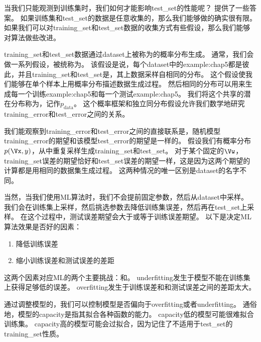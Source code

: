 
当我们只能观测到训练集时，我们如何才能影响\gls{test_set}的性能呢？
提供了一些答案。
如果训练集和\gls{test_set}的数据是任意收集的，那么我们能够做的确实很有限。
如果我们可以对\gls{training_set}和\gls{test_set}数据的收集方式有些假设，那么我们能够对算法做些改进。

\gls{training_set}和\gls{test_set}数据通过\gls{dataset}上被称为的概率分布生成。
通常，我们会做一系列假设，被统称为。
该假设是说，每个\gls{dataset}中的\gls{example:chap5}都是彼此，并且\gls{training_set}和\gls{test_set}是，其上数据采样自相同的分布。
这个假设使我们能够在单个样本上用概率分布描述数据生成过程。
然后相同的分布可以用来生成每一个训练\gls{example:chap5}和每一个测试\gls{example:chap5}。
我们将这个共享的潜在分布称为，记作$p_{\text{data}}$。
这个概率框架和独立同分布假设允许我们数学地研究\gls{training_error}和\gls{test_error}之间的关系。

我们能观察到\gls{training_error}和\gls{test_error}之间的直接联系是，随机模型\gls{training_error}的期望和该模型\gls{test_error}的期望是一样的。
假设我们有概率分布$p(\Vx,y)$，从中重复采样生成\gls{training_set}和\gls{test_set}。
对于某个固定的$\Vw$，\gls{training_set}误差的期望恰好和\gls{test_set}误差的期望一样，这是因为这两个期望的计算都是用相同的数据集生成过程。
这两种情况的唯一区别是\gls{dataset}的名字不同。

当然，当我们使用\gls{ML}算法时，我们不会提前固定参数，然后从\gls{dataset}中采样。
我们会在训练集上采样，然后挑选参数去降低训练集误差，然后再在\gls{test_set}上采样。
在这个过程中，测试误差期望会大于或等于训练误差期望。
以下是决定\gls{ML}算法效果是否好的因素：
\begin{enumerate}
    \item 降低训练误差
    \item 缩小训练误差和测试误差的差距
\end{enumerate}

这两个因素对应\gls{ML}的两个主要挑战：和。
\gls{underfitting}发生于模型不能在训练集上获得足够低的误差。
\gls{overfitting}发生于训练误差和和测试误差之间的差距太大。


通过调整模型的，我们可以控制模型是否偏向于\gls{overfitting}或者\gls{underfitting}。
通俗地，模型的\gls{capacity}是指其拟合各种函数的能力。
\gls{capacity}低的模型可能很难拟合训练集。
\gls{capacity}高的模型可能会过拟合，因为记住了不适用于\gls{test_set}的\gls{training_set}性质。

